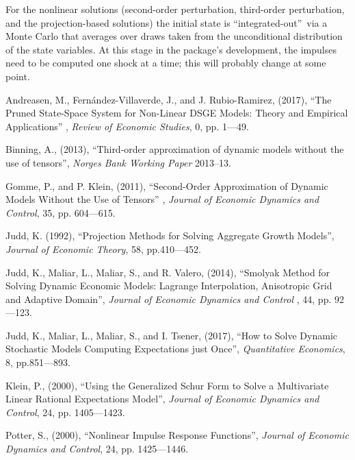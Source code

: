 \documentclass[notitlepage,11pt]{article}
\begin{document}
\bigskip

For the nonlinear solutions (second-order perturbation, third-order
perturbation, and the projection-based solutions) the initial state is
\textquotedblleft integrated-out\textquotedblright\ via a Monte Carlo that
averages over draws taken from the unconditional distribution of the state
variables. At this stage in the package's development, the impulses need to
be computed one shock at a time; this will probably change at some point.

\begin{thebibliography}{9}
\bibitem{} Andreasen, M., Fern\'{a}ndez-Villaverde, J., and J.
Rubio-Ramirez, (2017), \textquotedblleft The Pruned State-Space System for
Non-Linear DSGE Models: Theory and Empirical Applications\textquotedblright
, \textit{Review of Economic Studies}, 0, pp. 1---49.

\bibitem{} Binning, A., (2013), \textquotedblleft Third-order approximation
of dynamic models without the use of tensors\textquotedblright , \textit{%
Norges Bank Working Paper} 2013--13.

\bibitem{} Gomme, P., and P. Klein, (2011), \textquotedblleft Second-Order
Approximation of Dynamic Models Without the Use of Tensors\textquotedblright
, \textit{Journal of Economic Dynamics and Control}, 35, pp. 604---615.

\bibitem{} Judd, K. (1992), \textquotedblleft Projection Methods for Solving
Aggregate Growth Models\textquotedblright , \textit{Journal of Economic
Theory}, 58, pp.410---452.

\bibitem{} Judd, K., Maliar, L., Maliar, S., and R. Valero, (2014),
\textquotedblleft Smolyak Method for Solving Dynamic Economic Models:
Lagrange Interpolation, Anisotropic Grid and Adaptive
Domain\textquotedblright , \textit{Journal of Economic Dynamics and Control}%
, 44, pp. 92---123.

\bibitem{} Judd, K., Maliar, L., Maliar, S., and I. Tsener, (2017),
\textquotedblleft How to Solve Dynamic Stochastic Models Computing
Expectations just Once\textquotedblright , \textit{Quantitative Economics},
8, pp.851---893.

\bibitem{} Klein, P., (2000), \textquotedblleft Using the Generalized Schur
Form to Solve a Multivariate Linear Rational Expectations
Model\textquotedblright , \textit{Journal of Economic Dynamics and Control},
24, pp. 1405---1423.

\bibitem{} Potter, S., (2000), \textquotedblleft Nonlinear Impulse Response
Functions\textquotedblright , \textit{Journal of Economic Dynamics and
Control}, 24, pp. 1425---1446.
\end{thebibliography}
\end{document}
